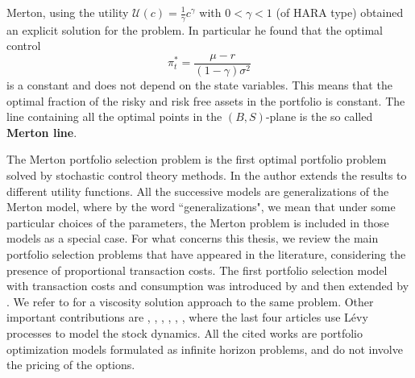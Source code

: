 Merton, using the utility $\mathcal{U}(c) = \frac{1}{\gamma} c^{\gamma}$ with $0<\gamma<1$ (of HARA type) obtained an explicit solution for the problem. In particular he found that 
the optimal control
\begin{equation}\label{Merton_policy}
  \pi^*_t = \frac{\mu-r}{(1-\gamma)\sigma^2}
\end{equation}
is a constant and does not depend on the state variables.  
This means that the optimal fraction of the risky and risk free assets in the portfolio is constant.
The line containing all the optimal points in the $(B,S)$-plane is the so called \textbf{Merton line}.


\noindent
The Merton portfolio selection problem is the first optimal portfolio problem solved by stochastic control theory methods. 
In \cite{Me71} the author extends the results to different utility functions.
All the successive models are generalizations of the Merton model, where by 
the word ``generalizations", we mean that under some particular choices of the parameters, the Merton problem is included in those models as a special case.
For what concerns this thesis, we review the main portfolio selection problems that have appeared in the literature, considering the presence of proportional transaction costs.
The first portfolio selection model with transaction costs and consumption was introduced by \cite{Co86} and then extended by \cite{DaNo90}. We refer to \cite{ShSo94}
for a viscosity solution approach to the same problem. 
Other important contributions are 
\cite{DaYi09}, \cite{Dai10}, \cite{LiuLo02}, \cite{LiuLo07}, \cite{BKR01}, \cite{OkSu01}, \cite{Kab16} where the last four articles use Lévy processes to model the stock dynamics. 
All the cited works are portfolio optimization models formulated as infinite horizon problems, and do not involve the pricing of the options.

